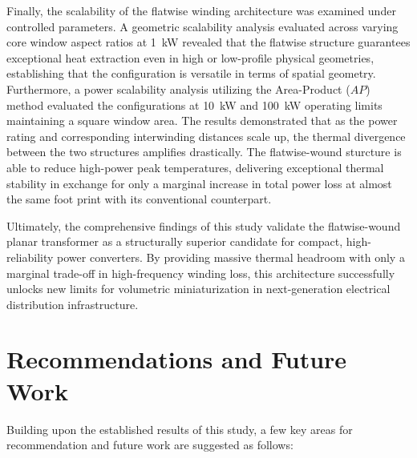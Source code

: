 Finally, the scalability of the flatwise winding architecture was examined under controlled parameters. A geometric scalability analysis evaluated across varying core window aspect ratios at 1~kW revealed that the flatwise structure guarantees exceptional heat extraction even in high or low-profile physical geometries, establishing that the configuration is versatile in terms of spatial geometry. Furthermore, a power scalability analysis utilizing the Area-Product ($AP$) method evaluated the configurations at 10~kW and 100~kW operating limits maintaining a square window area. The results demonstrated that as the power rating and corresponding interwinding distances scale up, the thermal divergence between the two structures amplifies drastically. The flatwise-wound sturcture is able to reduce high-power peak temperatures, delivering exceptional thermal stability in exchange for only a marginal increase in total power loss at almost the same foot print with its conventional counterpart.

Ultimately, the comprehensive findings of this study validate the flatwise-wound planar transformer as a structurally superior candidate for compact, high-reliability power converters. By providing massive thermal headroom with only a marginal trade-off in high-frequency winding loss, this architecture successfully unlocks new limits for volumetric miniaturization in next-generation electrical distribution infrastructure.

\section{Recommendations and Future Work}
Building upon the established results of this study, a few key areas for recommendation and future work are suggested as follows:

